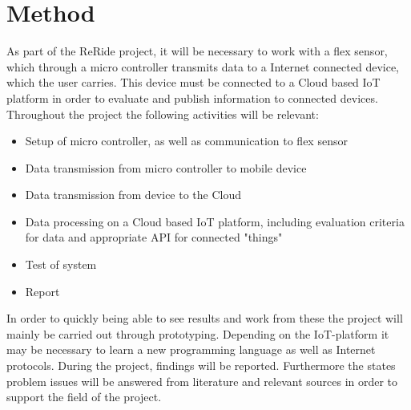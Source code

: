 \section{Method}
As part of the ReRide project, it will be necessary to work with a flex sensor, which through a micro controller transmits data to a Internet connected device, which the user carries. This device must be connected to a Cloud based IoT platform in order to evaluate and publish information to connected devices. Throughout the project the following activities will be relevant:
\begin{itemize}
	\item Setup of micro controller, as well as communication to flex sensor
	\item Data transmission from micro controller to mobile device
	\item Data transmission from device to the Cloud
	\item Data processing on a Cloud based IoT platform, including evaluation criteria for data and appropriate API for connected "things"
	\item Test of system
	\item Report
\end{itemize}

In order to quickly being able to see results and work from these the project will mainly be carried out through prototyping. Depending on the IoT-platform it may be necessary to learn a new programming language as well as Internet protocols. During the project, findings will be reported. Furthermore the states problem issues will be answered from literature and relevant sources in order to support the field of the project.